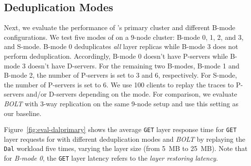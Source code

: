 


\subsection{Deduplication Modes}
\label{sec:eval-primary}
Next, we evaluate the performance of \sysname's primary cluster
and different B-mode configurations.
%
We test five modes of \sysname on a 9-node cluster: B-mode 0, 1, 2, and 3,
and S-mode.
%
B-mode 0 deduplicates \emph{all} layer replicas while B-mode 3 does not perform deduplication.
Accordingly, B-mode 0 doesn't have P-servers while B-mode 3 doesn't have D-servers.
%
For the remaining two B-modes, B-mode 1 and B-mode 2, the number of P-servers
is set to 3 and 6, respectively. For S-mode, the number of P-servers is set to 6.
%
We use 100 clients to replay the traces to P-servers and/or D-servers
depending on the mode.
%
For comparison, we evaluate \emph{BOLT} with 3-way replication on the same 9-node
setup and use this setting as our baseline. 


Figure~\ref{fig:eval-dalprimary} shows the average \texttt{GET} layer response
time for \texttt{GET} layer requests for \sysname with different deduplication
modes and \emph{BOLT} by replaying the \texttt{Dal} workload five times, varying
the layer size (from 5~MB to 25~MB).
%
Note that for \emph{B-mode 0}, the \texttt{GET} layer latency refers to the
\emph{layer restoring latency}.


